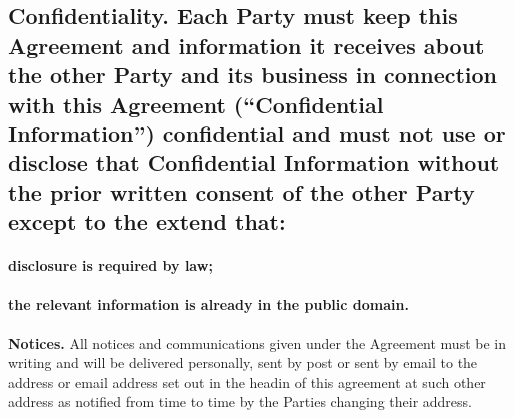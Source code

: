\documentclass[a4paper]{article}
\begin{document}
\subsection{\textbf{Confidentiality}.  Each Party must keep this Agreement and information it receives about the other Party and its business in connection with this Agreement (``\textbf{Confidential Information}'') confidential and must not use or disclose that Confidential Information without the prior written consent of the other Party except to the extend that:}

\paragraph{disclosure is required by law;}

\paragraph{the relevant information is already in the public domain.}

\textbf{Notices.}  All notices and communications given under the Agreement must be in writing and will be delivered personally, sent by post or sent by email to the address or email address set out in the headin of this agreement at such other address as notified from time to time by the Parties changing their address.
\end{document}
